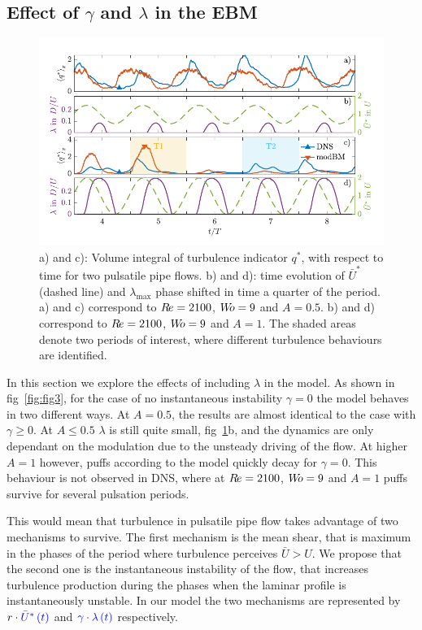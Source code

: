 \documentclass{article}
\DeclareRobustCommand{\Reynolds}{\ensuremath{R\hspace{-0.1em}e}\xspace}     %
\DeclareRobustCommand{\Womersley}{\ensuremath{W\hspace{-0.25em}o}\xspace}    %
\DeclareRobustCommand{\Amplitude}{\ensuremath{A}\xspace}    %
\begin{document}
\subsection{Effect of $\gamma$ and $\lambda$ in the EBM}
\begin{figure}
\centering
\includegraphics[width=\textwidth, trim=0mm 0mm 0mm 0mm, clip=true]{Figures9/Fig4.pdf}
\caption{a) and c): Volume integral of turbulence indicator $q^{*}$, with respect to time for two pulsatile pipe flows. b) and d): time evolution of $\bar{U}^{*}$ (dashed line) and $\lambda_{\max}$ phase shifted in time a quarter of the period. a) and c) correspond to $\Reynolds=2100$, $\Womersley=9$ and $\Amplitude=0.5$. b) and d) correspond to $\Reynolds=2100$, $\Womersley=9$ and $\Amplitude=1$. The shaded areas denote two periods of interest, where different turbulence behaviours are identified.}
\label{fig:fig4}
\end{figure}

In this section we explore the effects of including $\lambda$ in the model. As shown in fig~\ref{fig:fig3}, for the case of no instantaneous instability $\gamma=0$ the model behaves in two different ways. At $\Amplitude=0.5$, the results are almost identical to the case with $\gamma \geq 0$. At $\Amplitude \leq 0.5$ $\lambda$ is still quite small, fig~\ref{fig:fig4}b, and the dynamics are only dependant on the modulation due to the unsteady driving of the flow. At higher $\Amplitude=1$ however, puffs according to the model quickly decay for $\gamma=0$. This behaviour is not observed in DNS, where at $\Reynolds=2100$, $\Womersley=9$ and $\Amplitude=1$ puffs survive for several pulsation periods.

This would mean that turbulence in pulsatile pipe flow takes advantage of two mechanisms to survive. The first mechanism is the mean shear, that is maximum in the phases of the period where turbulence perceives $\bar{U}>U$. We propose that the second one is the instantaneous instability of the flow, that increases turbulence production during the phases when the laminar profile is instantaneously unstable. In our model the two mechanisms are represented by $r \cdot \textcolor{blue}{\bar{U}^{*}\left(t\right)}$ and $\textcolor{blue}{\gamma \cdot \lambda \left( t \right)}$ respectively.
\end{document}
